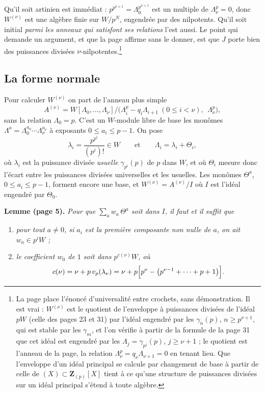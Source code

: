 \documentclass[11pt,a4paper]{article}
\begin{document}
Qu'il soit artinien est immédiat : $p^{p^{\nu+1}} = \Lambda_0^{p^{\nu+1}}$
est un multiple de $\Lambda_\nu^{p} = 0$, donc $W^{(\nu)}$ est une algèbre
finie sur $W/p^{N}$, engendrée par des nilpotents. Qu'il soit initial
\emph{parmi les anneaux qui satisfont ses relations} l'est aussi. Le point
qui demande un argument, et que la page affirme sans le donner, est que
$J$ porte bien des puissances divisées $\nu$-nilpotentes.\footnote{La page
place l'énoncé d'universalité entre crochets, sans démonstration. Il est
vrai : $W^{(\nu)}$ est le quotient de l'enveloppe à puissances divisées de
l'idéal $pW$ (celle des pages 23 et 31) par l'idéal engendré par les
$\gamma_n(p)$, $n \geqslant p^{\nu+1}$, qui est stable par les $\gamma_m$, et
l'on vérifie à partir de la formule de la page 31 que cet idéal est engendré
par les $\Lambda_j = \gamma_{p^{j}}(p)$, $j \geqslant \nu + 1$ ; le quotient
est l'anneau de la page, la relation $\Lambda_\nu^{p} = q_\nu
\Lambda_{\nu+1} = 0$ en tenant lieu. Que
l'enveloppe d'un idéal principal se calcule par changement de base à partir
de celle de $(X) \subset \mathbf{Z}_{(p)}[X]$ tient à ce qu'une structure de
puissances divisées sur un idéal principal s'étend à toute algèbre.}

\subsection*{La forme normale}

Pour calculer $W^{(\nu)}$ on part de l'anneau plus simple
\[
A^{(\nu)} = W[\Lambda_0, \ldots, \Lambda_\nu] \big/ \bigl(\Lambda_i^{p} - q_i
\Lambda_{i+1}\ (0 \leqslant i < \nu),\ \ \Lambda_\nu^{p}\bigr),
\]
sans la relation $\Lambda_0 = p$. C'est un $W$-module libre de base les
monômes $\Lambda^{a} = \Lambda_0^{a_0}\cdots\Lambda_\nu^{a_\nu}$ à
exposants $0 \leqslant a_i \leqslant p-1$. On pose
\[
\lambda_i = \frac{p^{p^{i}}}{(p^{i})!} \in W \qquad \text{et} \qquad
\Lambda_i = \lambda_i + \Theta_i ,
\]
où $\lambda_i$ est la puissance divisée \emph{usuelle} $\gamma_{p^{i}}(p)$ de
$p$ dans $W$, et où $\Theta_i$ mesure donc l'écart entre les puissances
divisées universelles et les usuelles. Les monômes
$\Theta^{a}$, $0 \leqslant a_i \leqslant p-1$, forment encore une base, et
$W^{(\nu)} = A^{(\nu)}/I$ où $I$ est l'idéal engendré par $\Theta_0$.

\textbf{Lemme (page 5).} \emph{Pour que $\sum_a w_a\, \Theta^{a}$ soit dans
$I$, il faut et il suffit que}
\begin{enumerate}
\item[a)] \emph{pour tout $a \neq 0$, si $a_i$ est la première composante non
nulle de $a$, on ait $w_a \in p^{i} W$ ;}
\item[b)] \emph{le coefficient $w_0$ de $1$ soit dans $p^{c(\nu)}W$, où}
\[
c(\nu) = \nu + p\, v_p(\lambda_\nu) = \nu + p\Bigl[p^{\nu} -
\bigl(p^{\nu-1} + \cdots + p + 1\bigr)\Bigr].
\]
\end{enumerate}
\end{document}

